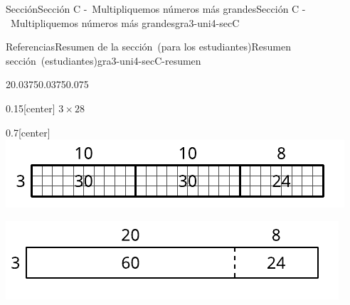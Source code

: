 \documentclass[oneside,10pt,]{article}
\begin{document}
\begin{sectionptx}{Sección}{Sección C -~Multipliquemos números más grandes}{}{Sección C -~Multipliquemos números más grandes}{}{}{gra3-uni4-secC}
\begin{references-subsection}{Referencias}{Resumen de la sección~(para los estudiantes)}{}{Resumen sección~(estudiantes)}{}{}{gra3-uni4-secC-resumen}
\begin{sidebyside}{2}{0.0375}{0.0375}{0.075}
\begin{sbspanel}{0.15}[center]%
\(3\times 28\)%
\end{sbspanel}%
\begin{sbspanel}{0.7}[center]%
\includegraphics[width=\linewidth]{external/svg-source/tikz-file-141827-scale13.pdf}
\par
\includegraphics[width=\linewidth]{external/svg-source/tikz-file-158683-scale13.pdf}
\end{sbspanel}%
\end{sidebyside}%
\end{references-subsection}
\end{sectionptx}
%
%
\typeout{************************************************}
\typeout{************************************************}
%
\end{document}
